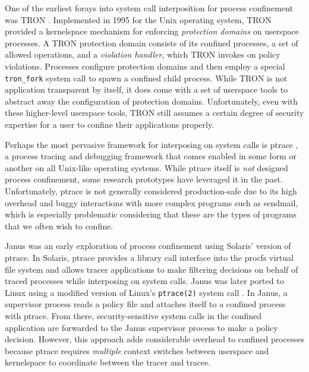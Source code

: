 \documentclass[dvipsnames, 12pt]{article}
\begin{document}
One of the earliest forays into system call interposition for process
confinement was TRON \cite{berman1995_tron}. Implemented in 1995 for the Unix
operating system, TRON provided a kernelspace mechanism for enforcing
\textit{protection domains} on userspace processes. A TRON protection domain
consists of its confined processes, a set of allowed operations, and
a \textit{violation handler}, which TRON invokes on policy violations. Processes
configure protection domains and then employ a special \texttt{tron\_fork}
system call to spawn a confined child process. While TRON is not application
transparent by itself, it does come with a set of userspace tools to abstract
away the configuration of protection domains. Unfortunately, even with these
higher-level userspace tools, TRON still assumes a certain degree of security
expertise for a user to confine their applications properly.

Perhaps the most pervasive framework for interposing on system calls is ptrace
\cite{padala2002_ptrace}, a process tracing and debugging framework that comes
enabled in some form or another on all Unix-like operating systems.  While
ptrace itself is \textit{not} designed process confinement, some research
prototypes \cite{goldberg96_janus, wagner1999_janus} have leveraged it in the
past. Unfortunately, ptrace is not generally considered production-safe due to
its high overhead and buggy interactions with more complex programs such as
sendmail, which is especially problematic considering that these are the types
of programs that we often wish to confine.

Janus \cite{goldberg96_janus,wagner1999_janus} was an early exploration of
process confinement using Solaris' version of ptrace. In Solaris, ptrace
provides a library call interface into the procfs virtual file system and allows
tracer applications to make filtering decisions on behalf of traced processes
while interposing on system calls. Janus was later ported to Linux using
a modified version of Linux's \texttt{ptrace(2)} system call
\cite{wagner1999_janus}. In Janus, a supervisor process reads a policy file and
attaches itself to a confined process with ptrace. From there,
security-sensitive system calls in the confined application are forwarded to the
Janus supervisor process to make a policy decision. However, this approach adds
considerable overhead to confined processes because ptrace requires
\textit{multiple} context switches between userspace and kernelspace to
coordinate between the tracer and tracee.
\end{document}
